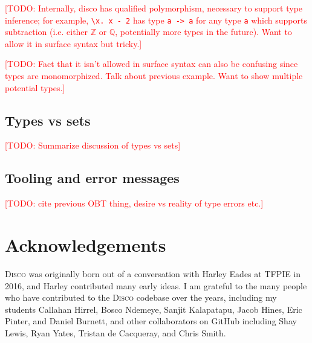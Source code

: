 \documentclass[submission,copyright,creativecommons]{eptcs}
\newcommand{\disco}{\textsc{Disco}\xspace}
\newcommand{\todo}[1]{\textcolor{red}{[TODO: #1]}}
\newcommand{\todo}[1]{}
\newcommand{\Z}{\mathbb{Z}}
\newcommand{\Q}{\mathbb{Q}}
\begin{document}
\todo{Internally, disco has qualified polymorphism, necessary to
  support type inference; for example,
  \verb|\x. x - 2| has type \verb|a -> a| for any type \verb|a| which
  supports subtraction (i.e. either $\Z$ or $\Q$, potentially more
  types in the future).  Want to allow it in surface syntax but tricky.}

\todo{Fact that it isn't allowed in surface syntax can also be
  confusing since types are monomorphized.  Talk about previous
  example. Want to show multiple potential types.}

\subsection{Types vs sets}
\label{sec:typesvsets}

\todo{Summarize discussion of types vs sets}

\subsection{Tooling and error messages}
\label{sec:errors}

\todo{cite previous OBT thing, desire vs reality of type errors etc.}

\section{Acknowledgements}
\label{sec:acks}

\disco was originally born out of a conversation with Harley Eades at
TFPIE in 2016, and Harley contributed many early ideas.  I am grateful
to the many people who have contributed to the \disco codebase over
the years, including my students Callahan Hirrel, Bosco Ndemeye,
Sanjit Kalapatapu, Jacob Hines, Eric Pinter, and Daniel Burnett, and
other collaborators on GitHub including Shay Lewis, Ryan Yates,
Tristan de Cacqueray, and Chris Smith.



\end{document}
